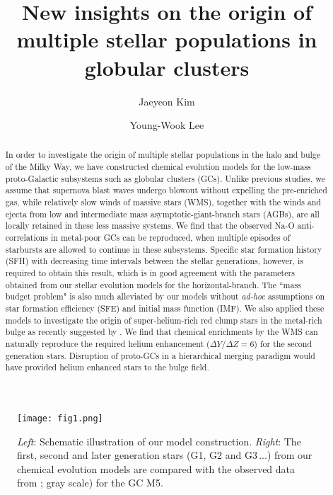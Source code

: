 \documentclass{iau}
\title[] 
{New insights on the origin of multiple stellar populations in globular clusters}
\author[Jaeyeon Kim \& Young-Wook Lee] 
{Jaeyeon Kim
 \and Young-Wook Lee}
\affiliation{Center for Galaxy Evolution Research \& Department of Astronomy, \\ Yonsei University, Seoul, Korea
 \\ email: {\tt jaeyeonkim93@gmail.com}, {\tt ywlee2@yonsei.ac.kr}}
\begin{document}
\maketitle

\begin{abstract}
In order to investigate the origin of multiple stellar populations in the halo and bulge of the Milky Way, we have constructed chemical evolution models for the low-mass proto-Galactic subsystems such as globular clusters (GCs). Unlike previous studies, we assume that supernova blast waves undergo blowout without expelling the pre-enriched gas, while relatively slow winds of massive stars (WMS), together with the winds and ejecta from low and intermediate mass asymptotic-giant-branch stars (AGBs), are all locally retained in these less massive systems. We find that the observed Na-O anti-correlations in metal-poor GCs can be reproduced, when multiple episodes of starbursts are allowed to continue in these subsystems. Specific star formation history (SFH) with decreasing time intervals between the stellar generations, however, is required to obtain this result, which is in good agreement with the parameters obtained from our stellar evolution models for the horizontal-branch. The ``{mass budget problem}" is also much alleviated by our models without \textit{ad-hoc} assumptions on star formation efficiency (SFE) and initial mass function (IMF). We also applied these models to investigate the origin of super-helium-rich red clump stars in the metal-rich bulge as recently suggested by \cite[Lee \etal\ (2015)]{Lee2015}. We find that chemical enrichments by the WMS can naturally reproduce the required helium enhancement ($\Delta{Y}/\Delta{Z}=6$) for the second generation stars. Disruption of proto-GCs in a hierarchical merging paradigm would have provided helium enhanced stars to the bulge field. 
\end{abstract}


\begin{figure}[b]
\begin{center}
 \texttt{[image: fig1.png]} 
 \caption{\textit{Left}: Schematic illustration of our model construction. \textit{Right}: The first, second and later generation stars (G1, G2 and G3\,...) from our chemical evolution models are compared with the observed data from \cite[Carretta \etal\ (2009a,b]{Carretta2009a}; gray scale) for the GC M5.}
   \label{fig1}
\end{center}
\end{figure}
\end{document}

